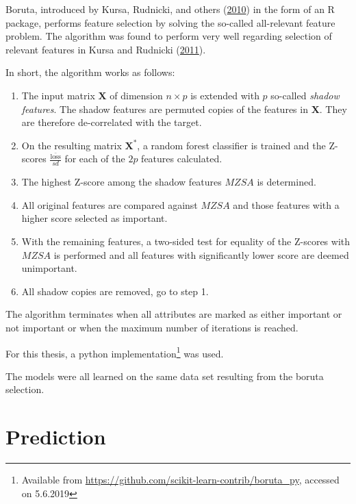 \documentclass[
  11pt,
  a4paper,
  DIV=12,captions=tableheading,oneside,titlepage]{scrbook}
\providecommand{\tightlist}{%
  \setlength{\itemsep}{0pt}\setlength{\parskip}{0pt}}
\begin{document}
Boruta, introduced by Kursa, Rudnicki, and others (\protect\hyperlink{ref-kursa2010boruta}{2010}) in the form of an R package, performs feature selection by solving the so-called all-relevant feature problem. The algorithm was found to perform very well regarding selection of relevant features in Kursa and Rudnicki (\protect\hyperlink{ref-kursa2011boruta}{2011}).

In short, the algorithm works as follows:

\begin{enumerate}
\def\labelenumi{\arabic{enumi}.}
\tightlist
\item
  The input matrix \(\mathbf{X}\) of dimension \(n \times p\) is extended with \(p\) so-called \emph{shadow features}. The shadow features are permuted copies of the features in \(\mathbf{X}\). They are therefore de-correlated with the target.
\item
  On the resulting matrix \(\mathbf{X^*}\), a random forest classifier is trained and the Z-scores \(\frac{\bar{\text{loss}}}{sd}\) for each of the \(2p\) features calculated.
\item
  The highest Z-score among the shadow features \(MZSA\) is determined.
\item
  All original features are compared against \(MZSA\) and those features with a higher score selected as important.
\item
  With the remaining features, a two-sided test for equality of the Z-scores with \(MZSA\) is performed and all features with significantly lower score are deemed unimportant.
\item
  All shadow copies are removed, go to step 1.
\end{enumerate}

The algorithm terminates when all attributes are marked as either important or not important or when the maximum number of iterations is reached.

For this thesis, a python implementation\footnote{Available from \url{https://github.com/scikit-learn-contrib/boruta_py}, accessed on 5.6.2019} was used.

The models were all learned on the same data set resulting from the boruta selection.

\hypertarget{methods-prediction}{%
\section{Prediction}\label{methods-prediction}}
\end{document}
